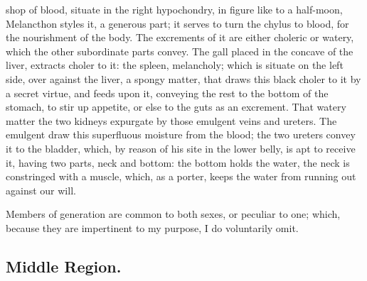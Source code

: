 shop of blood, situate in the right hypochondry, in figure like to a half-moon,
 Melancthon styles it, a generous part; it serves to turn
the chylus to blood, for the nourishment of the body. The excrements of it are
either choleric or watery, which the other subordinate parts convey. The gall
placed in the concave of the liver, extracts choler to it: the spleen,
melancholy; which is situate on the left side, over against the liver, a spongy
matter, that draws this black choler to it by a secret virtue, and feeds upon
it, conveying the rest to the bottom of the stomach, to stir up appetite, or
else to the guts as an excrement. That watery matter the two kidneys expurgate
by those emulgent veins and ureters. The emulgent draw this superfluous
moisture from the blood; the two ureters convey it to the bladder, which, by
reason of his site in the lower belly, is apt to receive it, having two parts,
neck and bottom: the bottom holds the water, the neck is constringed with a
muscle, which, as a porter, keeps the water from running out against our will.

Members of generation are common to both sexes, or peculiar to one; which,
because they are impertinent to my purpose, I do voluntarily omit.

\subsection{Middle Region.}

